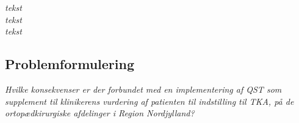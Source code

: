 \textit{tekst} \\
\textit{tekst} \\
\textit{tekst} \\

\subsection*{Problemformulering}

\begin{center}
	\textit{Hvilke konsekvenser er der forbundet med en implementering af QST som supplement til klinikerens vurdering af patienten til indstilling til TKA, på de ortopædkirurgiske afdelinger i Region Nordjylland?}
\end{center}




\begingroup
\label{litteraturliste}
\raggedright


\endgroup







